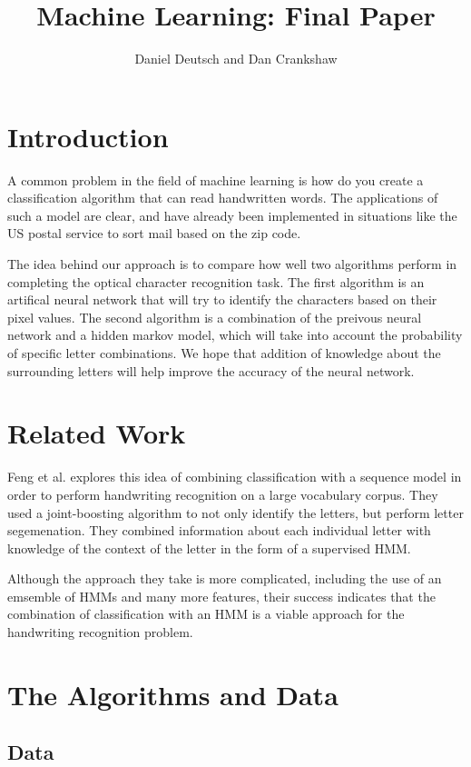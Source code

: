 \documentclass[11pt,a4paper,twocolumn]{article}
\author{Daniel Deutsch and Dan Crankshaw}
\title{Machine Learning: Final Paper}
\date{}
\begin{document}
\maketitle

\section{Introduction}

A common problem in the field of machine learning is how do you create a classification algorithm that can read handwritten words. The applications of such a model are clear, and have already been implemented in situations like the US postal service to sort mail based on the zip code. 

The idea behind our approach is to compare how well two algorithms perform in completing the optical character recognition task. The first algorithm is an artifical neural network that will try to identify the characters based on their pixel values. The second algorithm is a combination of the preivous neural network and a hidden markov model, which will take into account the probability of specific letter combinations. We hope that addition of knowledge about the surrounding letters will help improve the accuracy of the neural network.

\section{Related Work}

Feng et al.\cite{feng2008hidden} explores this idea of combining classification with a sequence model in order to perform handwriting recognition on a large vocabulary corpus. They used a joint-boosting algorithm to not only identify the letters, but perform letter segemenation. They combined information about each individual letter with knowledge of the context of the letter in the form of a supervised HMM.

Although the approach they take is more complicated, including the use of an emsemble of HMMs and many more features, their success indicates that the combination of classification with an HMM is a viable approach for the handwriting recognition problem.

\section{The Algorithms and Data}

\subsection*{Data}
\end{document}
